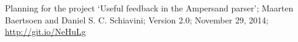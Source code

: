 
\label{sec:bibliography}

\begin{thebibliography}{99}
\setlength\columnsep{35pt}
\begin{multicols}{2}
\small

	Planning for the project `Useful feedback in the Ampersand parser';
	Maarten Baertsoen and Daniel S. C. Schiavini;
	Version 2.0;
	November 29, 2014;
	\url{http://git.io/NeHuLg}

\end{multicols}

\end{thebibliography}